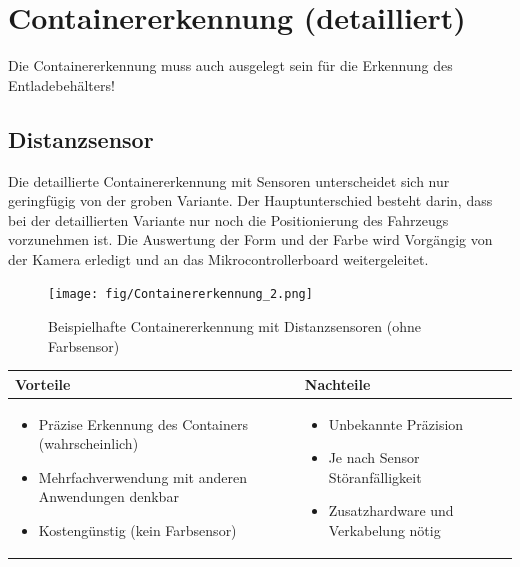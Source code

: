 
\section{Containererkennung (detailliert)}
Die Containererkennung muss auch ausgelegt sein für die Erkennung des Entladebehälters!

\subsection{Distanzsensor}
Die detaillierte Containererkennung mit Sensoren unterscheidet sich nur geringfügig von der groben Variante. Der Hauptunterschied besteht darin, dass bei der detaillierten Variante nur noch die Positionierung des Fahrzeugs vorzunehmen ist. Die Auswertung der Form und der Farbe wird Vorgängig von der Kamera erledigt und an das Mikrocontrollerboard weitergeleitet.
\begin{figure} [hbp]
	\centering
	\texttt{[image: fig/Containererkennung\_2.png]}
	\caption{Beispielhafte Containererkennung mit Distanzsensoren (ohne Farbsensor)}
\end{figure}

\begin{table}[h]
\begin{tabular}{p{} | p{}}


 \textbf{Vorteile} & \textbf{Nachteile} \\ \hline
	 
\begin{itemize}
\item Präzise Erkennung des Containers (wahrscheinlich)
\item Mehrfachverwendung mit anderen Anwendungen denkbar
\item Kostengünstig (kein Farbsensor)
\end{itemize}

 
 &
 
\begin{itemize}
\item Unbekannte Präzision
\item Je nach Sensor Störanfälligkeit
\item Zusatzhardware und Verkabelung nötig
\end{itemize}

\end{tabular}
\end{table}

